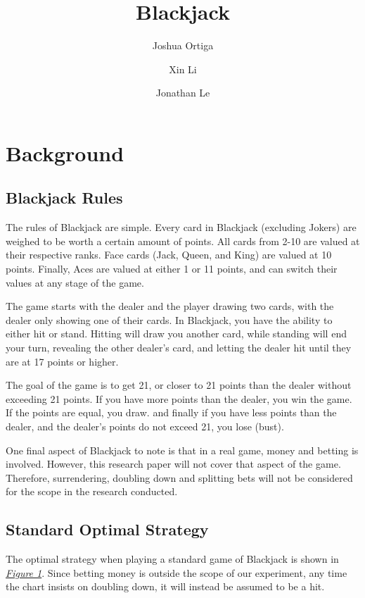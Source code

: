 \documentclass{article}
\title{Blackjack}
\author{Joshua Ortiga \\
\and
Xin Li \\
\and
Jonathan Le}
\begin{document}
\maketitle

\setlength{\parskip}{\baselineskip}%
\newpage

\section{Background}
\label{sec: Background}

	\subsection{Blackjack Rules}
	\label{sec: Blackjack Rules}

		The rules of Blackjack are simple. Every card in Blackjack (excluding Jokers) are weighed to be worth a certain
		amount of points. All cards from 2-10 are valued at their respective ranks. Face cards (Jack, Queen, and King) 
		are valued at 10 points. Finally, Aces are valued at either 1 or 11 points, and can switch their values at
		any stage of the game. 

		The game starts with the dealer and the player drawing two cards, with the dealer only showing one of their cards.
		In Blackjack, you have the ability to either hit or stand. Hitting will draw you another card, while standing will 
		end your turn, revealing the other dealer's card, and letting the dealer hit until they are at 17 points or higher.

		The goal of the game is to get 21, or closer to 21 points than the dealer without exceeding 21 points. If you have more points than the dealer,
		you win the game. If the points are equal, you draw.
		and finally if you have less points than the dealer, and the dealer's points do not exceed 21, you lose (bust).

		One final aspect of Blackjack to note is that in a real game, money and betting is involved. However, this research paper
		will not cover that aspect of the game. Therefore, surrendering, doubling down and splitting bets will not be considered
		for the scope in the research conducted.

	\subsection{Standard Optimal Strategy}
	\label{sec: Optimal Strategy}

		The optimal strategy when playing a standard game of Blackjack is shown in \hyperlink{fig1}{\textit{Figure 1}}.
		Since betting money is outside the scope of our experiment, any time the chart insists on doubling down, 
		it will instead be assumed to be a hit.
		
\end{document}
